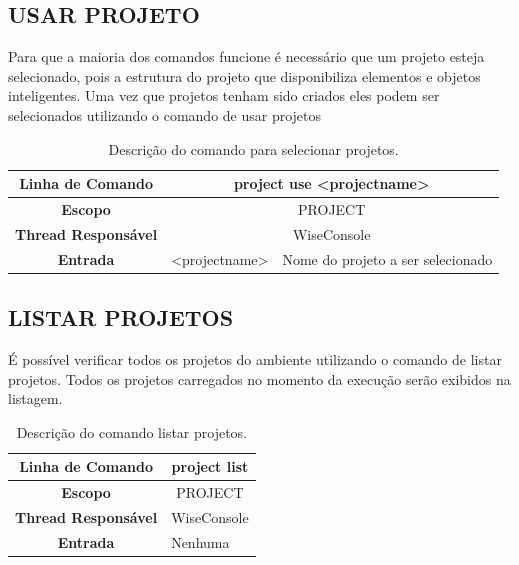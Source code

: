 \subsection{USAR PROJETO}\label{sec:use_projects}

Para que a maioria dos comandos funcione é necessário que um projeto esteja selecionado, pois a estrutura do projeto que disponibiliza elementos e objetos inteligentes. Uma vez que projetos tenham sido criados eles podem ser selecionados utilizando o comando de usar projetos

\begin{center}
	\begin{table}[!htbp]
		\begin{tabular}{|c|c|m{}|}
			\hline
			\textbf{Linha de Comando} & \multicolumn{2}{c|}{project use <project\underline{\space\space}name>} \\
			\hline
			\textbf{Escopo} & \multicolumn{2}{c|}{PROJECT} \\
			\hline
			\textbf{Thread Responsável} & \multicolumn{2}{c|}{WiseConsole} \\
			\hline
			\textbf{Entrada} & <project\underline{\space\space}name> & Nome do projeto a ser selecionado \\
			\hline
		\end{tabular}
		\caption{Descrição do comando para selecionar projetos.}
		\label{tab:use_project}
	\end{table}
\end{center}

\subsection{LISTAR PROJETOS}\label{sec:list_projects}

É possível verificar todos os projetos do ambiente utilizando o comando de listar projetos. Todos os projetos carregados no momento da execução serão exibidos na listagem.

\begin{center}
	\begin{table}[!htbp]
		\begin{tabular}{|c|m{}|}
			\hline
			\textbf{Linha de Comando} & \multicolumn{1}{c|}{project list} \\
			\hline
			\textbf{Escopo} & \multicolumn{1}{c|}{PROJECT} \\
			\hline
			\textbf{Thread Responsável} & \multicolumn{1}{c|}{WiseConsole} \\
			\hline
			\textbf{Entrada} & Nenhuma \\
			\hline
		\end{tabular}
		\caption{Descrição do comando listar projetos.}
		\label{tab:list_project}
	\end{table}
\end{center}

